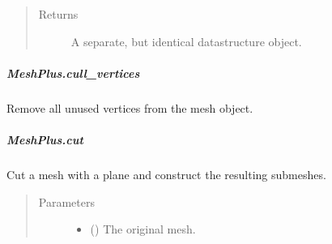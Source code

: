 \documentclass[letterpaper,10pt,english]{sphinxmanual}
\begin{document}
\begin{fulllineitems}
\begin{fulllineitems}
\begin{quote}
\begin{description}
\item[{Returns}] \leavevmode
{} \textendash{} A separate, but identical datastructure object.

\end{description}\end{quote}

\end{fulllineitems}



\subparagraph{MeshPlus.cull\_vertices}
\label{\detokenize{api/generated/directional_clustering.mesh.MeshPlus.cull_vertices:meshplus-cull-vertices}}\label{\detokenize{api/generated/directional_clustering.mesh.MeshPlus.cull_vertices::doc}}

\begin{fulllineitems}
\label{\detokenize{api/generated/directional_clustering.mesh.MeshPlus.cull_vertices:directional_clustering.mesh.MeshPlus.cull_vertices}}
Remove all unused vertices from the mesh object.

\end{fulllineitems}



\subparagraph{MeshPlus.cut}
\label{\detokenize{api/generated/directional_clustering.mesh.MeshPlus.cut:meshplus-cut}}\label{\detokenize{api/generated/directional_clustering.mesh.MeshPlus.cut::doc}}

\begin{fulllineitems}
\label{\detokenize{api/generated/directional_clustering.mesh.MeshPlus.cut:directional_clustering.mesh.MeshPlus.cut}}
Cut a mesh with a plane and construct the resulting submeshes.
\begin{quote}\begin{description}
\item[{Parameters}] \leavevmode\begin{itemize}
\item {} 
 () \textendash{} The original mesh.


\end{itemize}
\end{description}
\end{quote}
\end{fulllineitems}
\end{fulllineitems}
\end{document}
